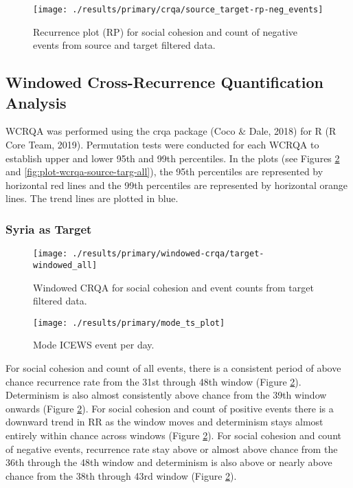 \documentclass[english,man]{apa6}
\begin{document}
\begin{figure}
\texttt{[image: ./results/primary/crqa/source\_target-rp-neg\_events]} \caption{Recurrence plot (RP) for social cohesion and count of negative events from source and target filtered data.}\label{fig:plot-rp-source-targ-neg}
\end{figure}

\hypertarget{windowed-cross-recurrence-quantification-analysis-1}{%
\subsection{Windowed Cross-Recurrence Quantification Analysis}\label{windowed-cross-recurrence-quantification-analysis-1}}

WCRQA was performed using the crqa package (Coco \& Dale, 2018) for R (R Core Team, 2019). Permutation tests were conducted for each WCRQA to establish upper and lower 95th and 99th percentiles. In the plots (see Figures \ref{fig:plot-wcrqa-targ-all} and \ref{fig:plot-wcrqa-source-targ-all}), the 95th percentiles are represented by horizontal red lines and the 99th percentiles are represented by horizontal orange lines. The trend lines are plotted in blue.

\hypertarget{syria-as-target-1}{%
\subsubsection{Syria as Target}\label{syria-as-target-1}}

\begin{figure}
\texttt{[image: ./results/primary/windowed-crqa/target-windowed\_all]} \caption{Windowed CRQA for social cohesion and event counts from target filtered data.}\label{fig:plot-wcrqa-targ-all}
\end{figure}

\begin{figure}
\texttt{[image: ./results/primary/mode\_ts\_plot]} \caption{Mode ICEWS event per day.}\label{fig:plot-mode-event}
\end{figure}

For social cohesion and count of all events, there is a consistent period of above chance recurrence rate from the 31st through 48th window (Figure \ref{fig:plot-wcrqa-targ-all}). Determinism is also almost consistently above chance from the 39th window onwards (Figure \ref{fig:plot-wcrqa-targ-all}). For social cohesion and count of positive events there is a downward trend in RR as the window moves and determinism stays almost entirely within chance across windows (Figure \ref{fig:plot-wcrqa-targ-all}). For social cohesion and count of negative events, recurrence rate stay above or almost above chance from the 36th through the 48th window and determinism is also above or nearly above chance from the 38th through 43rd window (Figure \ref{fig:plot-wcrqa-targ-all}).
\end{document}
